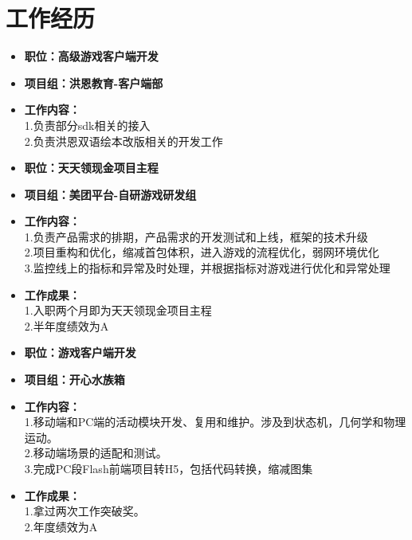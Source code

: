 \documentclass{resume}
\begin{document}
\section{工作经历}
\begin{itemize}
  \item {\textbf{职位：高级游戏客户端开发}}
  \item {\textbf{项目组：洪恩教育-客户端部}}
  \item {\textbf{工作内容：}}
  \\ 1.负责部分sdk相关的接入
  \\ 2.负责洪恩双语绘本改版相关的开发工作
\end{itemize}
\begin{itemize}
  \item {\textbf{职位：天天领现金项目主程}}
  \item {\textbf{项目组：美团平台-自研游戏研发组}}
  \item {\textbf{工作内容：}}
  \\1.负责产品需求的排期，产品需求的开发测试和上线，框架的技术升级
  \\2.项目重构和优化，缩减首包体积，进入游戏的流程优化，弱网环境优化
  \\3.监控线上的指标和异常及时处理，并根据指标对游戏进行优化和异常处理
  \item {\textbf{工作成果：}}
  \\1.入职两个月即为天天领现金项目主程
  \\2.半年度绩效为A
\end{itemize}
\begin{itemize}
  \item {\textbf{职位：游戏客户端开发}}
  \item {\textbf{项目组：开心水族箱}}
  \item {\textbf{工作内容：}}
  \\1.移动端和PC端的活动模块开发、复用和维护。涉及到状态机，几何学和物理运动。
  \\2.移动端场景的适配和测试。
  \\3.完成PC段Flash前端项目转H5，包括代码转换，缩减图集
  \item {\textbf{工作成果：}}
  \\1.拿过两次工作突破奖。
  \\2.年度绩效为A
\end{itemize}
\end{document}
